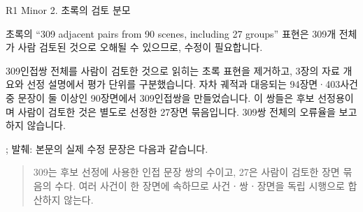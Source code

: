 \begin{reviewitem}{R1 Minor 2. 초록의 검토 분모}

\begin{reviewercomment}

초록의 ``309 adjacent pairs from 90 scenes, including 27 groups'' 표현은 309개 전체가 사람 검토된 것으로 오해될 수 있으므로, 수정이 필요합니다.

\end{reviewercomment}

\begin{authorresponse}

309인접쌍 전체를 사람이 검토한 것으로 읽히는 초록 표현을 제거하고, 3장의 자료 개요와 선정 설명에서 평가 단위를 구분했습니다. 자차 궤적과 대응되는 94장면·403사건 중 문장이 둘 이상인 90장면에서 309인접쌍을 만들었습니다. 이 쌍들은 후보 선정용이며 사람이 검토한 것은 별도로 선정한 27장면 묶음입니다. 309쌍 전체의 오류율을 보고하지 않습니다.


\end{authorresponse}

\begin{manuscriptrevision}{; 발췌: }
본문의 실제 수정 문장은 다음과 같습니다.

\begin{quote}
309는 후보 선정에 사용한 인접 문장 쌍의 수이고, 27은 사람이 검토한 장면 묶음의 수다. 여러 사건이 한 장면에 속하므로 사건ㆍ쌍ㆍ장면을 독립 시행으로 합산하지 않는다.
\end{quote}
\end{manuscriptrevision}

\end{reviewitem}

\clearpage

